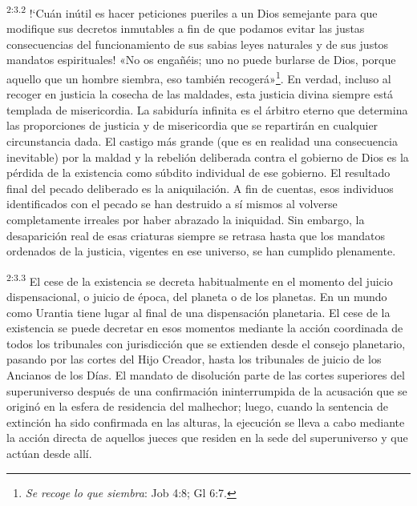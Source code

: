 \par
\textsuperscript{2:3.2} !`Cuán inútil es hacer peticiones pueriles a un Dios semejante para que modifique sus decretos inmutables a fin de que podamos evitar las justas consecuencias del funcionamiento de sus sabias leyes naturales y de sus justos mandatos espirituales! «No os engañéis; uno no puede burlarse de Dios, porque aquello que un hombre siembra, eso también recogerá»\footnote{\textit{Se recoge lo que siembra}: Job 4:8; Gl 6:7.}. En verdad, incluso al recoger en justicia la cosecha de las maldades, esta justicia divina siempre está templada de misericordia. La sabiduría infinita es el árbitro eterno que determina las proporciones de justicia y de misericordia que se repartirán en cualquier circunstancia dada. El castigo más grande (que es en realidad una consecuencia inevitable) por la maldad y la rebelión deliberada contra el gobierno de Dios es la pérdida de la existencia como súbdito individual de ese gobierno. El resultado final del pecado deliberado es la aniquilación. A fin de cuentas, esos individuos identificados con el pecado se han destruido a sí mismos al volverse completamente irreales por haber abrazado la iniquidad. Sin embargo, la desaparición real de esas criaturas siempre se retrasa hasta que los mandatos ordenados de la justicia, vigentes en ese universo, se han cumplido plenamente.

\par
\textsuperscript{2:3.3} El cese de la existencia se decreta habitualmente en el momento del juicio dispensacional, o juicio de época, del planeta o de los planetas. En un mundo como Urantia tiene lugar al final de una dispensación planetaria. El cese de la existencia se puede decretar en esos momentos mediante la acción coordinada de todos los tribunales con jurisdicción que se extienden desde el consejo planetario, pasando por las cortes del Hijo Creador, hasta los tribunales de juicio de los Ancianos de los Días. El mandato de disolución parte de las cortes superiores del superuniverso después de una confirmación ininterrumpida de la acusación que se originó en la esfera de residencia del malhechor; luego, cuando la sentencia de extinción ha sido confirmada en las alturas, la ejecución se lleva a cabo mediante la acción directa de aquellos jueces que residen en la sede del superuniverso y que actúan desde allí.

